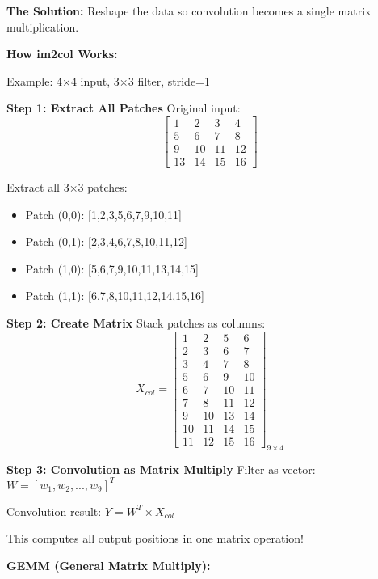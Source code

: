 \documentclass[12pt]{article}
\newcommand{\explanation}[1]{{\color{explanationcolor}#1}}
\begin{document}
\begin{enumerate}[(a)]
{{    \textbf{The Solution:}
    Reshape the data so convolution becomes a single matrix multiplication.
    }
    
    \textbf{How im2col Works:}
    
    \explanation{
    Example: 4×4 input, 3×3 filter, stride=1
    
    \textbf{Step 1: Extract All Patches}
    Original input:
    \[
    \begin{bmatrix}
    1 & 2 & 3 & 4 \\
    5 & 6 & 7 & 8 \\
    9 & 10 & 11 & 12 \\
    13 & 14 & 15 & 16
    \end{bmatrix}
    \]
    
    Extract all 3×3 patches:
    \begin{itemize}
        \item Patch (0,0): [1,2,3,5,6,7,9,10,11]
        \item Patch (0,1): [2,3,4,6,7,8,10,11,12]
        \item Patch (1,0): [5,6,7,9,10,11,13,14,15]
        \item Patch (1,1): [6,7,8,10,11,12,14,15,16]
    \end{itemize}
    
    \textbf{Step 2: Create Matrix}
    Stack patches as columns:
    \[
    X_{col} = \begin{bmatrix}
    1 & 2 & 5 & 6 \\
    2 & 3 & 6 & 7 \\
    3 & 4 & 7 & 8 \\
    5 & 6 & 9 & 10 \\
    6 & 7 & 10 & 11 \\
    7 & 8 & 11 & 12 \\
    9 & 10 & 13 & 14 \\
    10 & 11 & 14 & 15 \\
    11 & 12 & 15 & 16
    \end{bmatrix}_{9 \times 4}
    \]
    
    \textbf{Step 3: Convolution as Matrix Multiply}
    Filter as vector: $W = [w_1, w_2, ..., w_9]^T$
    
    Convolution result: $Y = W^T \times X_{col}$
    
    This computes all output positions in one matrix operation!
    }
    
    \textbf{GEMM (General Matrix Multiply):}
    
}
\end{enumerate}
\end{document}
